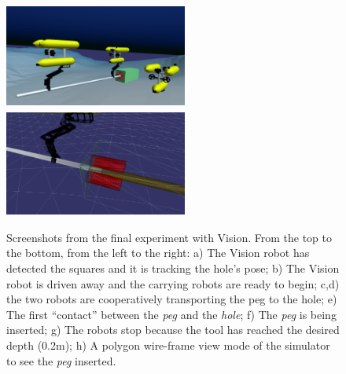 \begin{figure}[H]
{	}
		\vspace{1px}
	\centerline{
		\includegraphics[width=6cm, height=3.5cm]{screenUWSIM/7.png}
		\includegraphics[width=6cm, height=3.5cm]{screenUWSIM/8.png}
	}
	\caption[Screenshots from the final experiment]{Screenshots from the final experiment with Vision. From the top to the bottom, from the left to the right: a) The Vision robot has detected the squares and it is tracking the hole's pose; b) The Vision robot is driven away and the carrying robots are ready to begin; c,d) the two robots are cooperatively transporting the peg to the hole; e) The first \enquote{contact} between the \textit{peg} and the \textit{hole}; f) The \textit{peg} is being inserted; g) The robots stop because the tool has reached the desired depth (0.2m); h) A polygon wire-frame view mode of the simulator to see the \textit{peg} inserted.}

	\label{fig:screenSimulation}
\end{figure}


